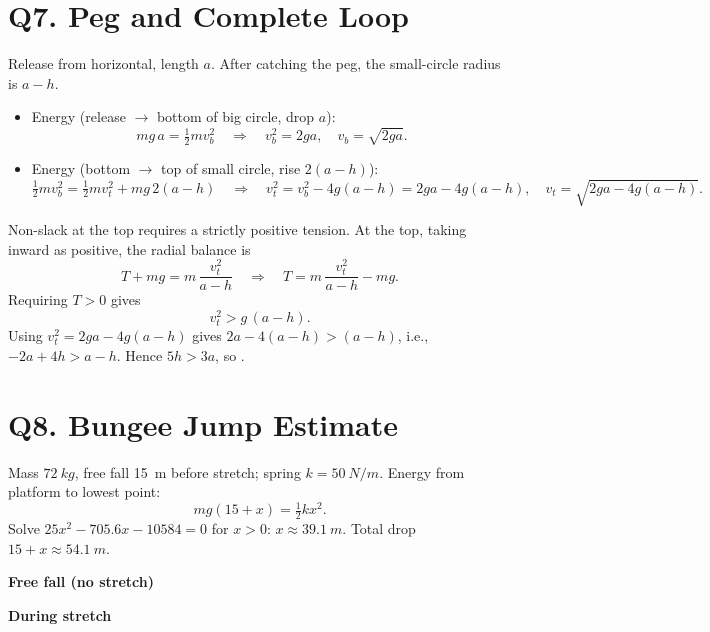 \documentclass[11pt]{article}
\newcommand{\ans}[1]{\boxed{\displaystyle #1}}
\begin{document}
\section*{Q7. Peg and Complete Loop}
Release from horizontal, length $a$. After catching the peg, the small-circle radius is $a-h$.

\begin{itemize}
  \item Energy (release $\to$ bottom of big circle, drop $a$):
  \[ mg\,a = \tfrac12 m v_b^2 \quad\Rightarrow\quad v_b^2 = 2ga,\quad v_b=\sqrt{2ga}. \]
  \item Energy (bottom $\to$ top of small circle, rise $2(a-h)$):
  \[ \tfrac12 m v_b^2 = \tfrac12 m v_t^2 + mg\,2(a-h)
     \quad\Rightarrow\quad v_t^2 = v_b^2 - 4g(a-h) = 2ga - 4g(a-h),\quad v_t=\sqrt{2ga-4g(a-h)}. \]
\end{itemize}

Non-slack at the top requires a strictly positive tension. At the top, taking inward as positive, the radial balance is
\[ T + mg = m\,\frac{v_t^2}{a-h} \quad\Rightarrow\quad T = m\,\frac{v_t^2}{a-h} - mg. \]
Requiring $T>0$ gives
\[ v_t^2 > g\,(a-h). \]
Using $v_t^2 = 2ga - 4g(a-h)$ gives $2a - 4(a-h) > (a-h)$, i.e., $-2a + 4h > a - h$.
Hence $5h > 3a$, so \ans{h > \tfrac{3}{5}a}.

\section*{Q8. Bungee Jump Estimate}
Mass $\SI{72}{kg}$, free fall \SI{15}{m} before stretch; spring $k=\SI{50}{N/m}$. Energy from platform to lowest point:
\[ mg(15+x)=\tfrac12 k x^2. \]
Solve $25x^2-705.6x-10584=0$ for $x>0$: $\ans{x\approx\SI{39.1}{m}}$. Total drop $\ans{15+x\approx\SI{54.1}{m}}$.

\begin{center}
\begin{minipage}{0.45\textwidth}\centering
\textbf{Free fall (no stretch)}
\end{minipage}\hfill
\begin{minipage}{0.45\textwidth}\centering
\textbf{During stretch}
\end{minipage}
\end{center}
\end{document}
